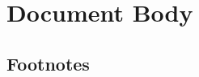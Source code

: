 \documentclass[11pt]{article}
\begin{document}






\section{Document Body}

\subsection{Footnotes}
\end{document}
